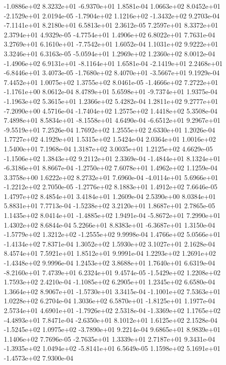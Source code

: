 -1.0886e+02  8.3232e+01 -6.9370e+01  1.8581e-04
 1.0663e+02  8.0452e+01 -2.1529e+01  2.0194e-05
-1.7904e+02  1.1216e+02 -1.3432e+02  9.2703e-04
-7.1141e+01  8.2180e+01  6.5813e+01  2.3612e-05
7.2597e+01 8.3372e+01 2.3794e+01  4.9329e-05
-4.7754e+01  1.4906e+02  6.8022e+01  7.7631e-04
 3.2769e+01  6.1610e+01 -7.7542e+01  1.6052e-04
1.1031e+02 9.9222e+01 3.3246e+01  6.3163e-05
-5.0594e+01  1.2969e+02  1.2360e+02  8.0012e-04
-1.4906e+02  6.9131e+01 -8.1164e+01  1.6581e-04
-2.1419e+01  2.2468e+01 -6.8446e+01  3.4073e-05
-1.7680e+02  8.4070e+01 -3.5667e+01  9.1929e-04
7.4452e+01 1.0075e+02 1.3755e+02  8.0461e-05
-1.4666e+02  7.2722e+01 -1.1761e+00  8.0612e-04
 8.4789e+01  5.6598e+01 -9.7374e+01  1.9375e-04
-1.1963e+02  5.3615e+01  1.2366e+02  5.4282e-04
 1.2811e+02  9.2777e+01 -7.2090e+00  4.5716e-04
-1.7404e+02  1.2575e+02  1.4418e+02  5.3508e-04
 7.4898e+01  8.5834e+01 -8.1558e+01  4.6490e-04
-6.6512e+01  9.2967e+01 -9.5519e+01  7.2526e-04
1.7692e+02 1.2555e+02 2.6330e+01  1.2026e-04
1.7727e+02 4.1929e+01 1.5315e+02  1.5424e-04
2.0364e+01 1.0016e+02 1.5400e+01  7.1968e-04
1.3187e+02 3.0035e+01 1.2125e+02  4.6629e-05
-1.1506e+02  1.3843e+02  9.2112e+01  2.3369e-04
-1.4844e+01  8.1324e+01 -6.3186e+01  8.8667e-04
-1.2750e+02  7.6078e+01  1.4962e+02  1.1259e-04
3.3758e+00 1.6222e+02 8.2732e+01  7.6960e-04
-4.0114e+01  5.6966e+01 -1.2212e+02  2.7050e-05
-1.2776e+02  8.1883e+01  1.4912e+02  7.6646e-05
1.4797e+02 8.4854e+01 3.4184e+01  1.2609e-04
2.5390e+00 8.0384e+01 5.8831e+01  7.7713e-04
-1.5238e+02  3.2120e+01  1.8687e+01  2.7865e-05
 1.1435e+02  8.0414e+01 -1.4885e+02  1.9491e-04
-5.8672e+01  7.2990e+01  1.4302e+02  8.6844e-04
 5.2266e+01  8.8383e+01 -6.3687e+01  1.3150e-04
-1.5779e+02  1.3212e+02 -1.2555e+02  9.9998e-04
 1.4766e+02  5.0566e+01 -1.4134e+02  7.8371e-04
1.3052e+02 1.5930e+02 3.1027e+01  2.1628e-04
8.4574e+01 7.5921e+01 1.8512e+01  9.9991e-04
 1.2293e+02  1.2691e+02 -1.4348e+02  9.9996e-04
1.2453e+02 3.8688e+01 1.7640e+01  6.6319e-04
-8.2160e+01  7.4739e+01  6.2324e+01  9.4574e-05
-1.5429e+02  1.2208e+02  1.7593e+02  2.4210e-04
-1.1085e+02  6.2905e+01  1.2345e+02  6.6580e-04
 1.3664e+02  8.9067e+01 -1.5730e+01  3.3415e-04
-1.1001e+02  7.5363e+01  1.0228e+02  6.2704e-04
 1.3036e+02  6.5870e+01 -1.8125e+01  1.1977e-04
 2.5734e+01  4.6901e+01 -1.7926e+02  2.5318e-04
-1.3369e+02  1.1765e+02 -4.4893e+01  7.8471e-04
-2.6350e+01  8.1012e+01  1.6125e+02  2.1528e-04
-1.5245e+02  1.0975e+02 -3.7890e+01  9.2214e-04
9.6865e+01 8.9839e+01 1.1406e+02  7.7696e-05
-2.7635e+01  1.3339e+01  2.7187e+01  9.3431e-04
-1.3935e+02  1.0494e+02 -5.8141e+01  6.5649e-05
 1.1598e+02  5.1691e+01 -1.4573e+02  7.9300e-04
